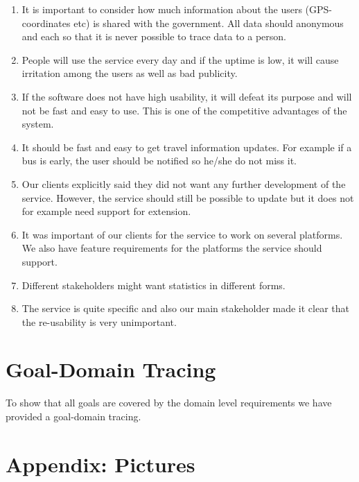 \documentclass[a4paper]{article}
\begin{document}
		\begin{enumerate}
  			\item It is important to consider how much information about the users (GPS-coordinates etc) is shared with the government.	All data should anonymous and each so that it is never possible to trace data to a person.
  			\item People will use the service every day and if the uptime is low, it will cause irritation among the users as well as bad publicity.
  			\item If the software does not have high usability, it will defeat its purpose and will not be fast and easy to use. This is one of the competitive advantages of the system.
  			\item It should be fast and easy to get travel information updates. For example if a bus is early, the user should be notified so he/she do not miss it.
  			\item Our clients explicitly said they did not want any further development of the service. However, the service should still be possible to update but it does not for example need support for extension.
  			\item It was important of our clients for the service to work on several platforms. We also have feature requirements for the platforms the service should support.
  			\item Different stakeholders might want statistics in different forms.
  			\item The service is quite specific and also our main stakeholder made it clear that the re-usability is very unimportant.	
		\end{enumerate}

	
	\section{Goal-Domain Tracing}
	 To show that all goals are covered by the domain level requirements we have provided a goal-domain tracing. \\
				
		
	\section{Appendix: Pictures} %
		\label{sec:appendix}
		
\end{document}
